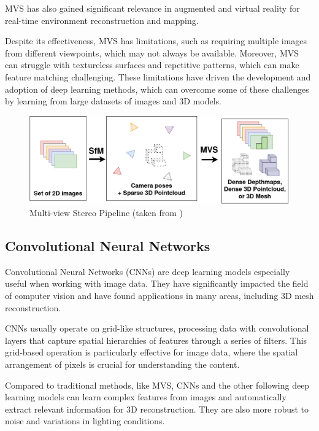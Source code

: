 MVS has also gained significant relevance in augmented and virtual reality for real-time environment reconstruction and mapping.

Despite its effectiveness, MVS has limitations, such as requiring multiple images from different viewpoints, which may not always be available.
Moreover, MVS can struggle with textureless surfaces and repetitive patterns, which can make feature matching challenging.
These limitations have driven the development and adoption of deep learning methods, which can overcome some of these challenges by learning from large datasets of images and 3D models.

\begin{figure}
    \centering
    \includegraphics[width=1\linewidth]{images/multi_view_stereo.png}
    \caption{Multi-view Stereo Pipeline (taken from \textcite{rouch_patchmatch_2023})}
    \label{fig:multi_view_stereo}
\end{figure}

\subsection{Convolutional Neural Networks} \label{section:cnns}
Convolutional Neural Networks (CNNs) are deep learning models especially useful when working with image data. They have significantly impacted the field of computer vision and have found applications in many areas, including 3D mesh reconstruction.

CNNs usually operate on grid-like structures, processing data with convolutional layers that capture spatial hierarchies of features through a series of filters. This grid-based operation is particularly effective for image data, where the spatial arrangement of pixels is crucial for understanding the content.

Compared to traditional methods, like MVS, CNNs and the other following deep learning models can learn complex features from images and automatically extract relevant information for 3D reconstruction. They are also more robust to noise and variations in lighting conditions.
